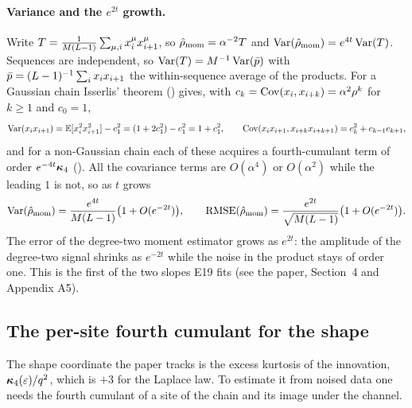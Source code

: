 \paragraph{Variance and the $e^{2t}$ growth.}
Write $T=\frac{1}{M(L-1)}\sum_{\mu,i}x^\mu_ix^\mu_{i+1}$, so
$\hat{\rho}_{\mathrm{mom}}=\alpha^{-2}T$ and $\operatorname{Var}(\hat{\rho}_{\mathrm{mom}})=e^{4t}\operatorname{Var}(T)$.
Sequences are independent, so $\operatorname{Var}(T)=M^{-1}\operatorname{Var}(\bar p)$ with
$\bar p=(L-1)^{-1}\sum_ix_ix_{i+1}$ the within-sequence average of the products.
For a Gaussian chain Isserlis' theorem () gives, with
$c_k=\operatorname{Cov}(x_i,x_{i+k})=\alpha^2\rho^{k}$ for $k\ge1$ and $c_0=1$,
\begin{equation}
  \operatorname{Var}(x_ix_{i+1})=\mathbb{E}[x_i^2x_{i+1}^2]-c_1^2=(1+2c_1^2)-c_1^2=1+c_1^2,
  \qquad
  \operatorname{Cov}(x_ix_{i+1},x_{i+k}x_{i+k+1})=c_k^2+c_{k-1}c_{k+1},
\end{equation}
and for a non-Gaussian chain each of these acquires a fourth-cumulant term of order
$e^{-4t}\bm{\kappa}_4$ (). All the covariance terms are $O(\alpha^4)$ or
$O(\alpha^2)$ while the leading $1$ is not, so as $t$ grows
\begin{equation}
  \operatorname{Var}(\hat{\rho}_{\mathrm{mom}})=\frac{e^{4t}}{M(L-1)}\bigl(1+O(e^{-2t})\bigr),
  \qquad
  \mathrm{RMSE}(\hat{\rho}_{\mathrm{mom}})=\frac{e^{2t}}{\sqrt{M(L-1)}}\bigl(1+O(e^{-2t})\bigr).
  \label{eq:rho-mom-var}
\end{equation}
The error of the degree-two moment estimator grows as $e^{2t}$: the amplitude of the
degree-two signal shrinks as $e^{-2t}$ while the noise in the product stays of order one.
This is the first of the two slopes E19 fits (see the paper, Section~4 and Appendix A5).

\subsection{The per-site fourth cumulant for the shape}

The shape coordinate the paper tracks is the excess kurtosis of the innovation,
$\bm{\kappa}_4(\varepsilon)/q^2$, which is $+3$ for the Laplace law. To estimate it from
noised data one needs the fourth cumulant of a site of the chain and its image under the
channel.

